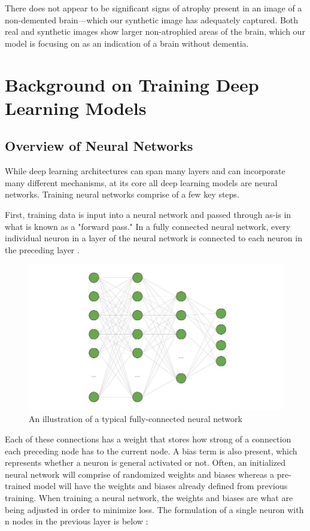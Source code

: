 \documentclass [MAS] {uclathes}
\begin{document}
There does not appear to be significant signs of atrophy present in an image of a non-demented brain---which our 
synthetic image has adequately captured. Both real and synthetic images show larger non-atrophied areas of the brain, 
which our model is focusing on as an indication of a brain without dementia.

\chapter{Background on Training Deep Learning Models}

\section{Overview of Neural Networks}
While deep learning architectures can span many layers and can incorporate many different mechanisms, at its core all 
deep learning models are neural networks. Training neural networks comprise of a few key steps. 

First, training data is input into a neural network and passed through as-is in what is known as a "forward pass." In a 
fully connected neural network, every individual neuron in a layer of the neural network is connected to each neuron in 
the preceding layer \cite{nn_intro}. 

\begin{figure}[H]
    \centering
    \includegraphics[width=0.75\linewidth]{figures/NN_diagram.jpg}
    \caption{An illustration of a typical fully-connected neural network}
\end{figure}

Each of these connections has a weight that stores how strong of a connection each preceding node has to the current 
node. A bias term is also present, which represents whether a neuron is general activated or not. Often, an initialized 
neural network will comprise of randomized weights and biases whereas a pre-trained model will have the weights and 
biases already defined from previous training. When training a neural network, the weights and biases are what are being 
adjusted in order to minimize loss. The formulation of a single neuron with n nodes in the previous layer is below \cite{deeplearningbook}:
\end{document}
